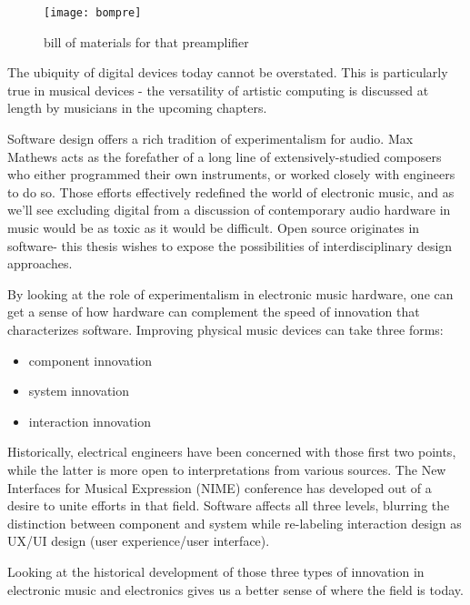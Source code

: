 \begin{figure}[h!]
  \caption{bill of materials for that preamplifier}
  \centering
    \texttt{[image: bompre]}
\end{figure}

The ubiquity of digital devices today cannot be overstated. This is particularly true in musical devices - the versatility of artistic computing is discussed at length by musicians in the upcoming chapters. 

Software design offers a rich tradition of experimentalism for audio. Max Mathews acts as the forefather of a long line of extensively-studied composers who either programmed their own instruments, or worked closely with engineers to do so. Those efforts effectively redefined the world of electronic music, and as we'll see excluding digital from a discussion of contemporary audio hardware in music would be as toxic as it would be difficult. Open source originates in software- this thesis wishes to expose the possibilities of interdisciplinary design approaches. 

	By looking at the role of experimentalism in electronic music hardware, one can get a sense of how hardware can complement the speed of innovation that characterizes software. Improving physical music devices can take three forms:  
	
\begin{itemize}
	
\item component innovation

\item system innovation 

\item interaction innovation  

\end{itemize}

Historically, electrical engineers have been concerned with those first two points, while the latter is more open to interpretations from various sources. The New Interfaces for Musical Expression (NIME) conference has developed out of a desire to unite efforts in that field. Software affects all three levels, blurring the distinction between component and system while re-labeling interaction design as UX/UI design (user experience/user interface). 

Looking at the historical development of those three types of innovation in electronic music and electronics gives us a better sense of where the field is today. 

